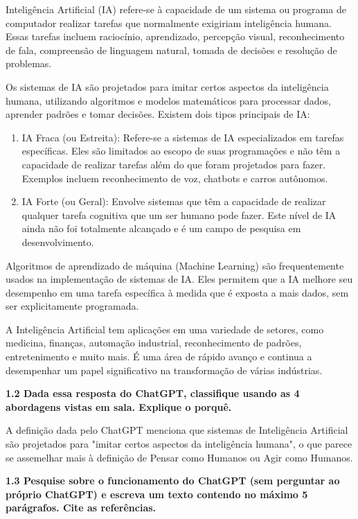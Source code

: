 Inteligência Artificial (IA) refere-se à capacidade de um sistema ou programa de computador realizar tarefas que normalmente exigiriam inteligência humana. Essas tarefas incluem raciocínio, aprendizado, percepção visual, reconhecimento de fala, compreensão de linguagem natural, tomada de decisões e resolução de problemas.

Os sistemas de IA são projetados para imitar certos aspectos da inteligência humana, utilizando algoritmos e modelos matemáticos para processar dados, aprender padrões e tomar decisões. Existem dois tipos principais de IA:

\begin{enumerate}
    \item IA Fraca (ou Estreita): Refere-se a sistemas de IA especializados em tarefas específicas. Eles são limitados ao escopo de suas programações e não têm a capacidade de realizar tarefas além do que foram projetados para fazer. Exemplos incluem reconhecimento de voz, chatbots e carros autônomos.
    \item IA Forte (ou Geral): Envolve sistemas que têm a capacidade de realizar qualquer tarefa cognitiva que um ser humano pode fazer. Este nível de IA ainda não foi totalmente alcançado e é um campo de pesquisa em desenvolvimento.
\end{enumerate}
    
Algoritmos de aprendizado de máquina (Machine Learning) são frequentemente usados na implementação de sistemas de IA. Eles permitem que a IA melhore seu desempenho em uma tarefa específica à medida que é exposta a mais dados, sem ser explicitamente programada.

A Inteligência Artificial tem aplicações em uma variedade de setores, como medicina, finanças, automação industrial, reconhecimento de padrões, entretenimento e muito mais. É uma área de rápido avanço e continua a desempenhar um papel significativo na transformação de várias indústrias.

\begin{adjustwidth}{1em}{}
\textbf{1.2 Dada essa resposta do ChatGPT, classifique usando as 4 abordagens vistas em
sala. Explique o porquê.}
\end{adjustwidth}

A definição dada pelo ChatGPT menciona que sistemas de Inteligência Artificial são projetados para "imitar certos aspectos da inteligência humana", o que parece se assemelhar mais à definição de Pensar como Humanos ou Agir como Humanos.

\begin{adjustwidth}{1em}{}
\textbf{1.3 Pesquise sobre o funcionamento do ChatGPT (sem perguntar ao próprio
ChatGPT) e escreva um texto contendo no máximo 5 parágrafos. Cite as referências.}
\end{adjustwidth}

